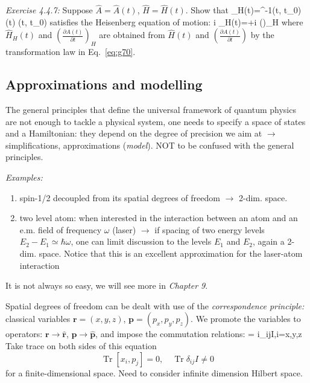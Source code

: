 \documentclass[12pt]{article}
\begin{document}
\emph{Exercise 4.4.7:} Suppose $\hat{A} = \hat{A}(t)$, $\hat{H} = \hat{H}(t)$.
Show that
\be
{}_{H}(t)=^{-1}\left(t, t_{0}\right) (t) \left(t, t_{0}\right)
\label{eq:g70}
\ee
satisfies the Heisenberg equation of motion:
\be
i \hbar {} _{H}(t)=+i \hbar\left(\right)_{H}
\ee
where $\hat{H}_{H}(t)$ and $\left(\frac{\partial A(t)}{\partial t}\right)_{H}$ are obtained 
from $\hat{H}(t)$ and $\left(\frac{\partial A(t)}{\partial t}\right)$ by the transformation
law in Eq.~\eqref{eq:g70}.


\subsection{Approximations and modelling} 

The general principles that define the universal
framework of quantum physics
are not enough to tackle
a physical system, one needs to
specify a space of states and a
Hamiltonian: they depend on the
degree of precision we aim at
$\to$ simplifications, approximations (\emph{model}).
NOT to be confused with the general principles.

\emph{Examples:}
 
\begin{enumerate}
\item spin-1/2 decoupled from its spatial
degrees of freedom $\to$ 2-dim. space.
\item two level atom: when interested in
the interaction between an atom and
an e.m. field of frequency $\omega$ (laser)
$\to$ if spacing of two energy levels 
$E_2-E_1 \simeq \hbar \omega$, one can limit
discussion to the levels $E_1$ and $E_2$,
again a 2-dim. space.
Notice that this is an excellent approximation 
for the laser-atom interaction
\end{enumerate}


It is not always so easy, we will see more in \emph{Chapter 9}.

Spatial degrees of freedom can be dealt with
use of the \emph{correspondence principle:}
classical variables $\mathbf{r} = (x,y,z)$, $\mathbf{p} = (p_x,p_y,p_z)$.
We promote the variables to operators:
$\mathbf{r} \to \hat{\mathbf{r}}$,
$\mathbf{p} \to \hat{\mathbf{p}}$,
and impose the commutation relations:
\be
[x_i,p_j] = i\hbar \delta_{ij}I,\quad i=x,y,z
\ee
Take trace on both sides of this equation
\[
\operatorname{Tr}\left[x_{i}, p_{j}\right]=0,\quad \operatorname{Tr} \delta_{i j} I \neq 0
\]
for a finite-dimensional space.
Need to consider infinite dimension Hilbert space.
\end{document}

